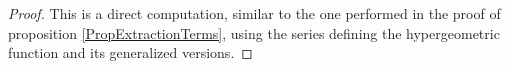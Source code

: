 \documentclass{jams-l}
\theoremstyle{definition}
\theoremstyle{remark}
\numberwithin{equation}{section}
\begin{document}
            \begin{proof}
            
                This is a direct computation, similar to the one performed in the proof of proposition \ref{PropExtractionTerms}, using the series defining the hypergeometric function and its generalized versions.
            
            \end{proof}
        
        





\end{document}

